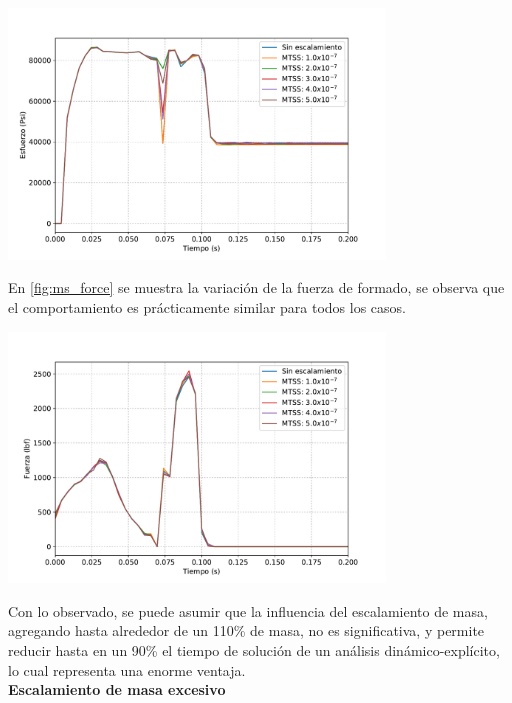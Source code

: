\begin{center}
\includegraphics[width=0.75\textwidth]{src/ch4/ms_von_mises.pdf}
\label{fig:ms_von_mises}
\end{center}

En \ref{fig:ms_force} se muestra la variación de la fuerza de formado, se observa que el 
comportamiento es prácticamente similar para todos los casos.

\begin{center}
\includegraphics[width=0.75\textwidth]{src/ch4/ms_force.pdf}
\label{fig:ms_force}
\end{center}

Con lo observado, se puede asumir que la influencia del escalamiento de masa, agregando hasta alrededor 
de un 110\% de masa, no es significativa, y permite reducir hasta en un 90\% el tiempo de solución de 
un análisis dinámico-explícito, lo cual representa una enorme ventaja.\\

\textbf{Escalamiento de masa excesivo} \\

